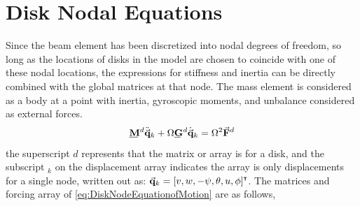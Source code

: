 \section{Disk Nodal Equations} \label{Disk Nodal Equations}
Since the beam element has been discretized into nodal degrees of freedom, so long as the locations of disks in the model are chosen to coincide with one of these nodal locations, the expressions for stiffness and inertia can be directly combined with the global matrices at that node. The mass element is considered as a body at a point with inertia, gyroscopic moments, and unbalance considered as external forces.
\begin{equation}\label{eq:DiskNodeEquationofMotion}
\bunderline{\mathbf{M}}^d\ddot{\vec{\mathbf{q}}}_k+\Omega\bunderline{\mathbf{G}}^d\dot{\vec{\mathbf{q}}}_k=\Omega^2\vec{\mathbf{F}}^d
\end{equation}
the superscript $ d $ represents that the matrix or array is for a disk, and the subscript $ _k $ on the displacement array indicates the array is only displacements for a single node, written out as: $ \vec{\mathbf{q}}_k = [v,w,-\psi,\theta,u,\phi]^{\textbf{{\tiny \textsf{T}}}} $. The matrices and forcing array of \eqref{eq:DiskNodeEquationofMotion} are as follows,
